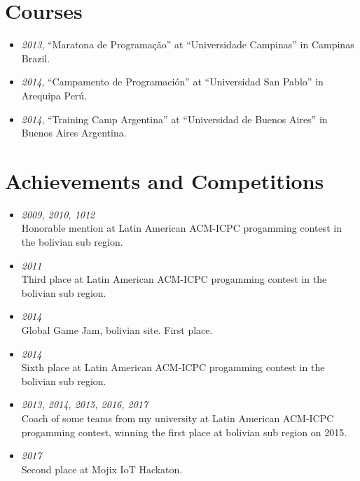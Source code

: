 \documentclass[margin, 10pt]{res} %
\begin{document}
\begin{resume}
\section{Courses}
\begin{itemize}
\item[] {\sl 2013}, ``Maratona de Programa\c{c}\~ao'' at ``Universidade Campinas'' in Campinas Brazil. \\
\item[] {\sl 2014}, ``Campamento de Programaci\'on'' at ``Universidad San Pablo'' in Arequipa Per\'u.\\
\item[] {\sl 2014}, ``Training Camp Argentina'' at ``Universidad de Buenos Aires'' in Buenos Aires Argentina.
\end{itemize}

\section{Achievements and Competitions}
\begin{itemize}
\item[] {\sl 2009, 2010, 1012} \\
Honorable mention at Latin American ACM-ICPC progamming contest in the bolivian sub region. \\
\item[] {\sl 2011} \\
Third place at Latin American ACM-ICPC progamming contest in the bolivian sub region. \\
\item[] {\sl 2014} \\
Global Game Jam, bolivian site. First place. \\

\item[] {\sl 2014} \\
  Sixth place at Latin American ACM-ICPC progamming contest in the bolivian sub region. \\

\item[] {\sl 2013, 2014, 2015, 2016, 2017} \\
  Coach of some teams from my university at Latin American ACM-ICPC progamming contest, winning the first place at bolivian sub region on 2015. \\

\item[] {\sl 2017} \\
  Second place at Mojix IoT Hackaton. \\
  

\end{itemize}
\end{resume}
\end{document}
